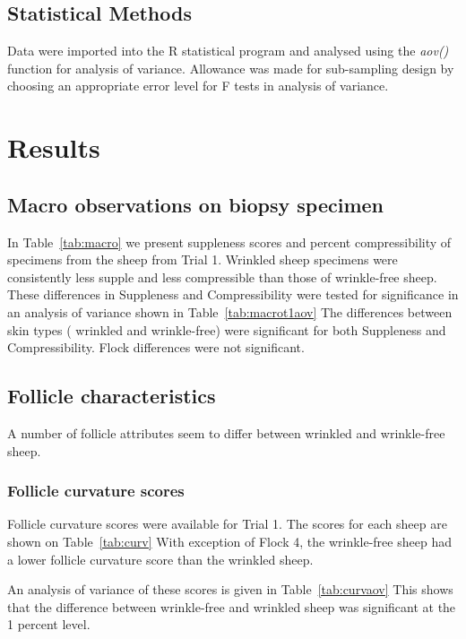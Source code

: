 \documentclass{article}
\begin{document}
\subsection{Statistical Methods}

Data were imported into the R statistical program \cite{rcoreteam-2017} and analysed using the {\em aov()} function for analysis of variance.
Allowance was made for sub-sampling design by choosing  an appropriate error level for F tests in analysis of variance. 

\section{Results}

\subsection{Macro observations on biopsy specimen}
In Table~\ref{tab:macro} we present suppleness scores and percent compressibility of specimens from the sheep from Trial 1.
%
Wrinkled sheep specimens were consistently less supple and less compressible than those of wrinkle-free sheep.
These differences in Suppleness and Compressibility were tested for significance in an analysis of variance shown in Table~\ref{tab:macrot1aov}
%
The differences between skin types ( wrinkled and wrinkle-free) were significant for both Suppleness and Compressibility. Flock differences were not significant.



\subsection{Follicle characteristics}
A number of follicle attributes seem to differ between wrinkled and wrinkle-free sheep. 

\subsubsection{Follicle curvature scores}
Follicle curvature scores were available for Trial 1. The scores for each sheep are shown on Table~\ref{tab:curv}
%
With exception of Flock 4, the wrinkle-free sheep had a lower follicle curvature score than the wrinkled sheep.

An analysis of variance of these scores is given in Table~\ref{tab:curvaov}
%
This shows that the difference between wrinkle-free and wrinkled sheep was significant at the 1 percent level.
\end{document}
